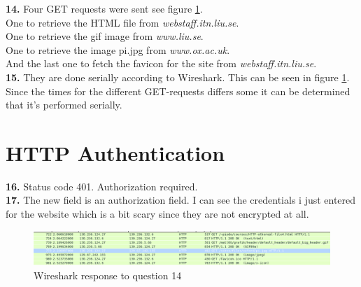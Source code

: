\documentclass[a4paper, 12pt, titlepage]{article}
\begin{document}
	\textbf{14.} Four GET requests were sent see figure \ref{figure}. 
		\\One to retrieve the HTML file from \emph{webstaff.itn.liu.se}.
		\\One to retrieve the gif image from \emph{www.liu.se}.
		\\One to retrieve the image pi.jpg from \emph{www.ox.ac.uk}. 
		\\And the last one to fetch the favicon for the site from \emph{webstaff.itn.liu.se}. 
	\\\textbf{15.} They are done serially according to Wireshark. This can be seen in figure \ref{figure}. Since the times for the different GET-requests differs some it can be determined that it's performed serially.

\section{HTTP Authentication}
	\textbf{16.} Status code 401. Authorization required.
	\\\textbf{17.} The new field is an authorization field. I can see the credentials i just entered for the website which is a bit scary since they are not encrypted at all.

\begin{figure}[p]
\includegraphics[angle=90, scale=0.5]{pic}
\caption{Wireshark response to question 14}
\label{figure}
\end{figure}
\end{document}
